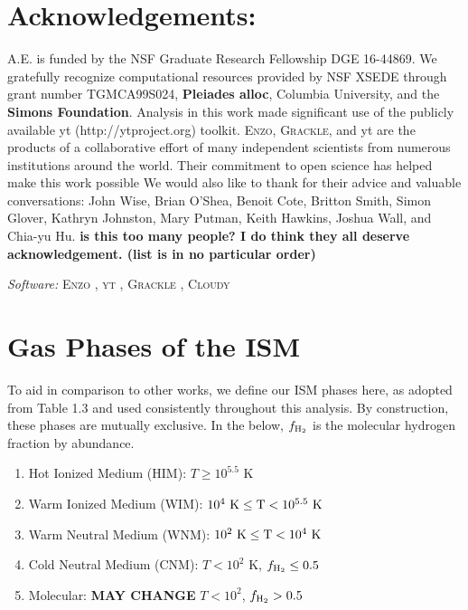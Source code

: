 \documentclass[twocolumn]{aastex61}
\begin{document}
\section*{Acknowledgements:} A.E. is funded by the NSF Graduate Research Fellowship DGE 16-44869. 
We gratefully recognize computational
resources provided by NSF XSEDE through grant number TGMCA99S024, \textbf{Pleiades alloc}, Columbia University, and the \textbf{Simons Foundation}. Analysis in this work
made significant use of the publicly available yt (http://ytproject.org)
toolkit. \textsc{Enzo}, \textsc{Grackle}, and yt are the products of a collaborative effort of many independent scientists from numerous institutions around
the world. Their commitment to open science has helped make
this work possible
We would also like to thank for their advice and valuable conversations: John Wise, Brian O'Shea, Benoit Cote, Britton Smith, Simon Glover, Kathryn Johnston, Mary Putman, Keith Hawkins, Joshua Wall, and Chia-yu Hu. \textbf{is this too many people? I do think they all deserve acknowledgement. (list is in no particular order)}

\textit{Software:} \textsc{Enzo} \citep{Enzo2014}, \textsc{yt} \citep{yt}, \textsc{Grackle} \citep{GrackleMethod}, \textsc{Cloudy} \citep{Cloudy2013}
%
%




\appendix

\section{Gas Phases of the ISM}
\label{appendix:phases}

To aid in comparison to other works, we define our ISM phases here, as adopted from \citet{Draine2011} Table 1.3 and used consistently throughout this analysis. By construction, these phases are mutually exclusive. In the below, $f_{\rm H_2}$ is the molecular hydrogen fraction by abundance.

\begin{enumerate}
\item Hot Ionized Medium (HIM): $T \geq 10^{5.5}$ K
\item Warm Ionized Medium (WIM): $10^{4}~\rm{K} \leq T < 10^{5.5}~\rm{K} $
\item Warm Neutral Medium (WNM): $10^{2}~\rm{K} \leq T < 10^{4}~ \rm{K}$
\item Cold Neutral Medium (CNM): $T < 10^2$ K, $f_{\rm H_2} \leq 0.5$
\item Molecular: \textbf{MAY CHANGE} $T < 10^2$, $f_{\rm H_2} > 0.5$
\end{enumerate}
\end{document}

